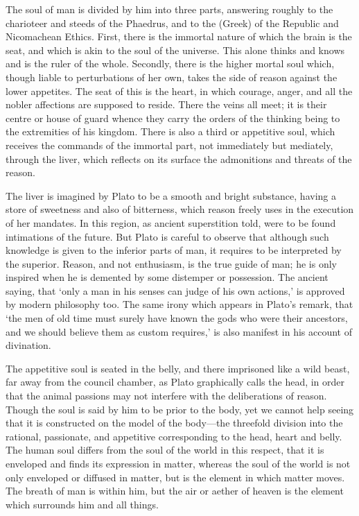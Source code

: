 The soul of man is divided by him into three parts, answering roughly to
the charioteer and steeds of the Phaedrus, and to the (Greek) of the
Republic and Nicomachean Ethics. First, there is the immortal nature of
which the brain is the seat, and which is akin to the soul of the
universe. This alone thinks and knows and is the ruler of the whole.
Secondly, there is the higher mortal soul which, though liable to
perturbations of her own, takes the side of reason against the lower
appetites. The seat of this is the heart, in which courage, anger, and all
the nobler affections are supposed to reside. There the veins all meet; it
is their centre or house of guard whence they carry the orders of the
thinking being to the extremities of his kingdom. There is also a third or
appetitive soul, which receives the commands of the immortal part, not
immediately but mediately, through the liver, which reflects on its
surface the admonitions and threats of the reason.

The liver is imagined by Plato to be a smooth and bright substance, having
a store of sweetness and also of bitterness, which reason freely uses in
the execution of her mandates. In this region, as ancient superstition
told, were to be found intimations of the future. But Plato is careful to
observe that although such knowledge is given to the inferior parts of
man, it requires to be interpreted by the superior. Reason, and not
enthusiasm, is the true guide of man; he is only inspired when he is
demented by some distemper or possession. The ancient saying, that ‘only a
man in his senses can judge of his own actions,’ is approved by modern
philosophy too. The same irony which appears in Plato’s remark, that ‘the
men of old time must surely have known the gods who were their ancestors,
and we should believe them as custom requires,’ is also manifest in his
account of divination.

The appetitive soul is seated in the belly, and there imprisoned like a
wild beast, far away from the council chamber, as Plato graphically calls
the head, in order that the animal passions may not interfere with the
deliberations of reason. Though the soul is said by him to be prior to the
body, yet we cannot help seeing that it is constructed on the model of the
body—the threefold division into the rational, passionate, and
appetitive corresponding to the head, heart and belly. The human soul
differs from the soul of the world in this respect, that it is enveloped
and finds its expression in matter, whereas the soul of the world is not
only enveloped or diffused in matter, but is the element in which matter
moves. The breath of man is within him, but the air or aether of heaven is
the element which surrounds him and all things.

